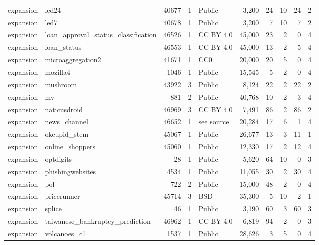 \begin{table}[htbp]
\begin{adjustbox}{max width=\linewidth}
\begin{tabular}{llrrlrrrrr}
expansion & led24 & 40677 & 1 & Public & 3{,}200 & 24 & 10 & 24 & 2 \\
expansion & led7 & 40678 & 1 & Public & 3{,}200 & 7 & 10 & 7 & 2 \\
expansion & loan\_approval\_status\_classification & 46526 & 1 & CC BY 4.0 & 45{,}000 & 23 & 2 & 0 & 4 \\
expansion & loan\_status & 46553 & 1 & CC BY 4.0 & 45{,}000 & 13 & 2 & 5 & 4 \\
expansion & microaggregation2 & 41671 & 1 & CC0 & 20{,}000 & 20 & 5 & 0 & 4 \\
expansion & mozilla4 & 1046 & 1 & Public & 15{,}545 & 5 & 2 & 0 & 4 \\
expansion & mushroom & 43922 & 3 & Public & 8{,}124 & 22 & 2 & 22 & 2 \\
expansion & mv & 881 & 2 & Public & 40{,}768 & 10 & 2 & 3 & 4 \\
expansion & naticusdroid & 46969 & 3 & CC BY 4.0 & 7{,}491 & 86 & 2 & 86 & 2 \\
expansion & news\_channel & 46652 & 1 & see source & 20{,}284 & 17 & 6 & 1 & 4 \\
expansion & okcupid\_stem & 45067 & 1 & Public & 26{,}677 & 13 & 3 & 11 & 1 \\
expansion & online\_shoppers & 45060 & 1 & Public & 12{,}330 & 17 & 2 & 12 & 4 \\
expansion & optdigits & 28 & 1 & Public & 5{,}620 & 64 & 10 & 0 & 3 \\
expansion & phishingwebsites & 4534 & 1 & Public & 11{,}055 & 30 & 2 & 30 & 4 \\
expansion & pol & 722 & 2 & Public & 15{,}000 & 48 & 2 & 0 & 4 \\
expansion & pricerunner & 45714 & 3 & BSD & 35{,}300 & 5 & 10 & 2 & 1 \\
expansion & splice & 46 & 1 & Public & 3{,}190 & 60 & 3 & 60 & 3 \\
expansion & taiwanese\_bankruptcy\_prediction & 46962 & 1 & CC BY 4.0 & 6{,}819 & 94 & 2 & 0 & 3 \\
expansion & volcanoes\_c1 & 1537 & 1 & Public & 28{,}626 & 3 & 5 & 0 & 4 \\
\bottomrule
\end{tabular}
\end{adjustbox}
\end{table}
